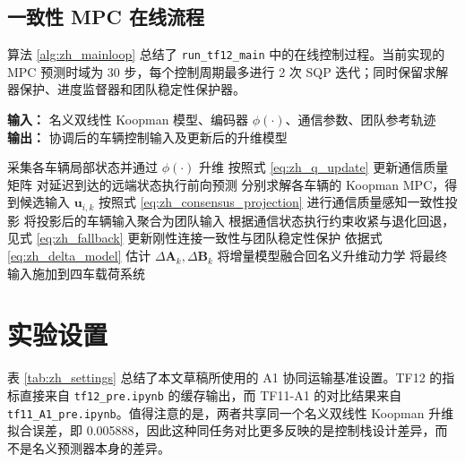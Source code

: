 \documentclass[twocolumn,3p,times,procedia]{elsarticle}
\newcommand{\methodname}{NRCT-Koopman}
\newcommand{\tfone}{TF11-A1}
\newcommand{\tftwo}{TF12}
\begin{document}
\subsection{一致性 MPC 在线流程}
算法 \ref{alg:zh_mainloop} 总结了 \texttt{run\_tf12\_main} 中的在线控制过程。当前实现的 MPC 预测时域为 30 步，每个控制周期最多进行 2 次 SQP 迭代；同时保留求解器保护、进度监督器和团队稳定性保护器。

\begin{algorithm}[h]
\footnotesize
\caption{\methodname{} 在线控制流程}
\label{alg:zh_mainloop}
\textbf{输入：} 名义双线性 Koopman 模型、编码器 $\phi(\cdot)$、通信参数、团队参考轨迹\\
\textbf{输出：} 协调后的车辆控制输入及更新后的升维模型
\begin{algorithmic}[1]
    \State 采集各车辆局部状态并通过 $\phi(\cdot)$ 升维
    \State 按照式 \eqref{eq:zh_q_update} 更新通信质量矩阵
    \State 对延迟到达的远端状态执行前向预测
    \State 分别求解各车辆的 Koopman MPC，得到候选输入 $\bm{u}_{i,k}$
    \State 按照式 \eqref{eq:zh_consensus_projection} 进行通信质量感知一致性投影
    \State 将投影后的车辆输入聚合为团队输入
    \State 根据通信状态执行约束收紧与退化回退，见式 \eqref{eq:zh_fallback}
    \State 更新刚性连接一致性与团队稳定性保护
        \State 依据式 \eqref{eq:zh_delta_model} 估计 $\Delta\bm{A}_{k},\Delta\bm{B}_{k}$
        \State 将增量模型融合回名义升维动力学
    \EndIf
    \State 将最终输入施加到四车载荷系统
\EndFor
\end{algorithmic}
\end{algorithm}

\section{实验设置}
表 \ref{tab:zh_settings} 总结了本文草稿所使用的 A1 协同运输基准设置。\tftwo{} 的指标直接来自 \texttt{tf12\_pre.ipynb} 的缓存输出，而 \tfone{} 的对比结果来自 \texttt{tf11\_A1\_pre.ipynb}。值得注意的是，两者共享同一个名义双线性 Koopman 升维拟合误差，即 0.005888，因此这种同任务对比更多反映的是控制栈设计差异，而不是名义预测器本身的差异。
\end{document}
